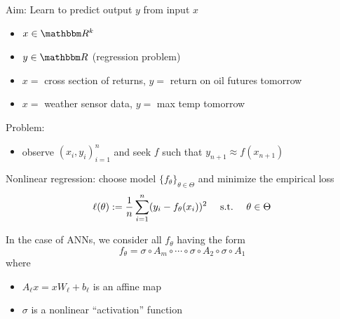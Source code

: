 \begin{frame}
    
    Aim: Learn to predict output $y$ from input $x$
    \begin{itemize}
        \item $x \in \RR^k$
        \vspace{0.5em}
        \item $y \in \RR$  (regression problem)
    \end{itemize}

    \Egs
    \begin{itemize}
        \item $x = $ cross section of returns, $y = $ return on oil futures tomorrow
        \vspace{0.5em}
        \item $x = $ weather sensor data, $y = $ max temp tomorrow
    \end{itemize}
        \vspace{0.5em}
        \vspace{0.5em}

    Problem:

    \begin{itemize}
        \item observe $(x_i, y_i)_{i=1}^n$ and seek $f$ such that $y_{n+1}
            \approx f(x_{n+1})$
    \end{itemize}


\end{frame}



\begin{frame}

    Nonlinear regression: choose model $\{f_\theta\}_{\theta \in \Theta}$ and minimize the empirical loss
    \begin{equation*}
        \ell(\theta) := \frac{1}{n}\sum_{i=1}^n (y_i - f_\theta(x_i))^2
        \quad \ \mathrm{s.t.}\  \quad \theta \in \Theta
    \end{equation*}


    \pause
    \vspace{0.5em}
    In the case of ANNs, we consider all $f_\theta$ having the form
    \begin{equation*}
        f_\theta
        = \sigma \circ A_{m} 
            \circ \cdots \circ \sigma \circ A_{2}  \circ \sigma \circ A_{1}
    \end{equation*}
    where
    \begin{itemize}
        \item $A_{\ell} x = x W_\ell + b_\ell $ is an affine map 
        \vspace{0.5em}
        \item $\sigma$ is a nonlinear ``activation'' function
    \end{itemize}

\end{frame}

